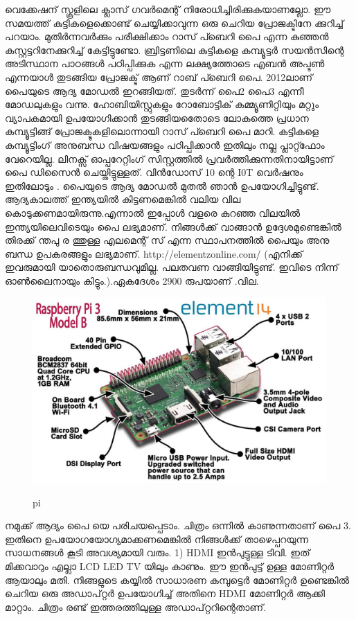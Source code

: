 \documentclass[10pt,a4paper]{report}
\begin{document}
വെക്കേഷന് സ്കൂളിലെ ക്ലാസ് ഗവർമെന്റ് നിരോധിച്ചിരിക്കുകയാണല്ലോ. ഈ സമയത്ത് കുട്ടികളെക്കൊണ്ട് ചെയ്യിക്കാവുന്ന ഒരു ചെറിയ പ്രോജക്ടിനേ ക്കുറിച്ച് പറയാം. മുതിർന്നവർക്കും പരീക്ഷിക്കാം റാസ് പ്ബെറി പൈ എന്ന കുഞ്ഞൻ കസ്റ്റട്ടറിനേക്കുറിച്ച് കേട്ടിട്ടുണ്ടോ. ബ്രിട്ടണിലെ കുട്ടികളെ കമ്പ്യൂട്ടർ സയൻസിന്റെ അടിസ്ഥാന പാഠങ്ങൾ പഠിപ്പിക്കുക എന്ന ലക്ഷ്യത്തോടെ എബൻ അപ്ടൺ എന്നയാൾ തുടങ്ങിയ പ്രോജക്ട് ആണ് റാബ് പ്ബെറി പൈ. 2012ലാണ് പൈയുടെ ആദ്യ മോഡൽ ഇറങ്ങിയത്. തുടർന്ന് പൈ2 പൈ3 എന്നീ മോഡലുകളും വന്നു. 
ഹോബിയിസ്റ്റുകളും റോബോട്ടിക് കമ്മ്യൂണിറ്റിയും മറ്റും വ്യാപകമായി ഉപയോഗിക്കാൻ തുടങ്ങിയതോെടെ ലോകത്തെ പ്രധാന കമ്പ്യൂട്ടിങ്ങ് പ്രോജക്ടുകളിലൊന്നായി റാസ് പ്ബെറി പൈ മാറി. കട്ടികളെ കമ്പ്യൂട്ടിംഗ് അനുബന്ധ വിഷയങ്ങളും പഠിപ്പിക്കാൻ ഇതിലും നല്ല പ്ലാറ്റ്ഫോം വേറെയില്ല. ലിനക്സ് ഓപ്പറേറ്റിംഗ് സിസ്റ്റത്തിൽ പ്രവർത്തിക്കുന്നതിനായിട്ടാണ് പൈ ഡിസൈൻ ചെയ്തിട്ടുള്ളത്. വിൻഡോസ് 10 ന്റെ I0T വെർഷനും ഇതിലോടും .
പൈയുടെ ആദ്യ മോഡൽ മുതൽ ഞാൻ ഉപയോഗിച്ചിട്ടുണ്ട്. ആദ്യകാലത്ത് ഇന്ത്യയിൽ കിട്ടണമെങ്കിൽ വലിയ വില കൊടുക്കണമായിരുന്നു.എന്നാൽ ഇപ്പോൾ വളരെ കുറഞ്ഞ വിലയിൽ ഇന്ത്യയിലെവിടെയും പൈ ലഭ്യമാണ്. നിങ്ങൾക്ക് വാങ്ങാൻ ഉദ്ദേശമുണ്ടെങ്കിൽ തിരക്ക് ന്തപു ര ത്തുള്ള എലമെന്റ് സ് എന്ന സ്ഥാപനത്തിൽ പൈയും അനു ബന്ധ ഉപകരങ്ങളും ലഭ്യമാണ്.  http://elementzonline.com/ (എനിക്ക് ഇവരുമായി യാതൊരുബന്ധവുമില്ല. പലതവണ വാങ്ങിയിട്ടുണ്ട്. ഇവിടെ നിന്ന് ഓൺലൈനായും കിട്ടും.).ഏകദേശം 2900  രുപയാണ് .വില.

 \begin{figure}[H]
  \center
\includegraphics[scale=.25]{images/pi1}
\label{pi1}
\caption{    pi}
\end{figure}


നമുക്ക് ആദ്യം പൈ യെ പരിചയപ്പെടാം. ചിത്രം ഒന്നിൽ കാണുന്നതാണ് പൈ 3. ഇതിനെ ഉപയോഗയോഗ്യമാക്കണമെങ്കിൽ നിങ്ങൾക്ക് താഴെപ്പറയുന്ന സാധനങ്ങൾ കൂടി അവശ്യമായി വരും.
1) HDMI ഇൻപുട്ടുള്ള ടിവി. ഇത് മിക്കവാറും എല്ലാ LCD LED TV യിലും കാണും. ഈ ഇൻപുട്ട് ഉള്ള മോണിറ്റർ ആയാലും മതി. നിങ്ങളുടെ കയ്യിൽ സാധാരണ കമ്പുട്ടെർ മോണിറ്റർ ഉണ്ടെങ്കിൽ ചെറിയ ഒരു അഡാപ്റ്റർ ഉപയോഗിച്ച് അതിനെ HDMI മോണിറ്റർ ആക്കി മാറ്റാം. ചിത്രം രണ്ട് ഇത്തരത്തിലുള്ള അഡാപ്റ്ററിന്റെതാണ്.
\end{document}
